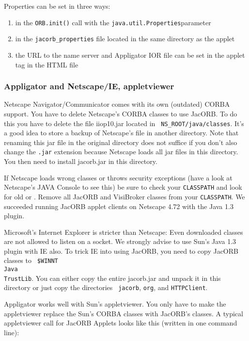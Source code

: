 \documentclass[12pt]{scrbook}
\begin{document}
Properties can be set in three ways:
\begin{enumerate}
     \item   in  the  {\tt ORB.init()}  call  with  the  
     {\tt java.util.Properties}parameter
                 
     \item  in the {\tt  jacorb\_properties} file  located in  the same
     directory as the applet

     \item the URL  to the name server and Appligator  IOR file can be
     set in the applet tag in the HTML file
\end{enumerate}


\subsubsection*{Appligator and Netscape/IE, appletviewer}

Netscape  Navigator/Communicator comes with  its own  (outdated) CORBA
support. You have to delete Netscape's CORBA classes to use JacORB. To
do  this  you have  to  delete the  file  iiop10.jar  located in  {\tt
NS\_ROOT/java/classes}.   It's  a  good  idea  to store  a  backup  of
Netscape's file in another directory. Note that renaming this jar file
in the original directory does  not suffice if you don't also change
the {\tt .jar} extension because  Netscape loads all jar files in this
directory. You then need to install jacorb.jar in this directory.

If Netscape loads wrong classes  or throws security exceptions (have a
look at  Netscape's JAVA Console  to see this)  be sure to  check your
{\tt CLASSPATH} and look for old or .  Remove all JacORB  and VisiBroker classes  from your
{\tt CLASSPATH}. We succeeded running JacORB applet clients on
Netscape 4.72 with the Java 1.3 plugin.

Microsoft's  Internet   Explorer  is  stricter   than  Netscape:  Even
downloaded classes are not allowed  to listen on a socket. We strongly
advise to  use Sun's Java  1.3 plugin with  IE also. To trick  IE into
using   JacORB,   you   need   to   copy  JacORB   classes   to   {\tt
\$WINNT\\Java\\TrustLib}.  You can either  copy the  entire jacorb.jar
and  unpack it in  this directory  or just  copy the  directories {\tt
jacorb}, {\tt org}, and {\tt HTTPClient}.

Appligator works well  with Sun's appletviewer. You only  have to make
the  appletviewer  replace  the  Sun's  CORBA  classes  with  JacORB's
classes.  A  typical appletviewer call  for JacORB Applets  looks like
this (written in one command line):
\end{document}
